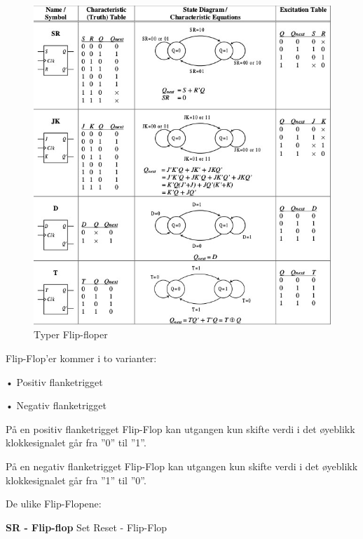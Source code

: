 \documentclass{article}
\begin{document}
	\begin{figure}[H]
		\includegraphics[scale = 0.6]{flip-flop.jpg}
		\caption{Typer Flip-floper}
	\end{figure}
	
	Flip-­Flop’er kommer  i  to  varianter:
	
	• Positiv flanketrigget
	
	• Negativ flanketrigget
	
	På  en  positiv  flanketrigget  Flip-­Flop kan  utgangen  kun  
	skifte  verdi  i  det  øyeblikk  klokkesignalet  går  fra ”0”  til ”1”.
	
	På  en  negativ  flanketrigget  Flip-­Flop  kan  utgangen  
	kun  skifte  verdi  i  det  øyeblikk  klokkesignalet  går  fra
	”1”  til ”0”.
	
	De ulike Flip-Flopene:
	
	\textbf{SR - Flip-flop}
	Set Reset - Flip-Flop
	
\end{document}
